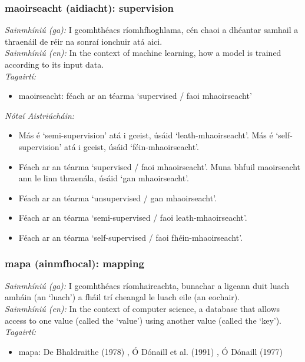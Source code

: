 \documentclass{article}
\begin{document}
\subsubsection*{maoirseacht (aidiacht): supervision}
 \noindent \textit{Sainmhíniú (ga):} I gcomhthéacs ríomhfhoghlama, cén chaoi a dhéantar samhail a thraenáil de réir na sonraí ionchuir atá aici.
\\
 \noindent \textit{Sainmhíniú (en):} In the context of machine learning, how a model is trained according to its input data.
\\
 \noindent \textit{Tagairtí:}
\begin{itemize}
	\item maoirseacht: féach ar an téarma `supervised / faoi mhaoirseacht'
\end{itemize}

 \noindent \textit{Nótaí Aistriúcháin:}
\begin{itemize}
	\item Más é `semi-supervision' atá i gceist, úsáid `leath-mhaoirseacht'. Más é `self-supervision' atá i gceist, úsáid `féin-mhaoirseacht'.
	\item Féach ar an téarma `supervised / faoi mhaoirseacht'. Muna bhfuil maoirseacht ann le linn thraenála, úsáid `gan mhaoirseacht'.
	\item Féach ar an téarma `unsupervised / gan mhaoirseacht'.
	\item Féach ar an téarma `semi-supervised / faoi leath-mhaoirseacht'.
	\item Féach ar an téarma `self-supervised / faoi fhéin-mhaoirseacht'.
\end{itemize}


\subsubsection*{mapa (ainmfhocal): mapping}
 \noindent \textit{Sainmhíniú (ga):} I gcomhthéacs ríomhaireachta, bunachar a ligeann duit luach amháin (an `luach') a fháil trí cheangal le luach eile (an eochair).
\\
 \noindent \textit{Sainmhíniú (en):} In the context of computer science, a database that allows access to one value (called the `value') using another value (called the `key').
\\
 \noindent \textit{Tagairtí:}
\begin{itemize}
	\item mapa: De Bhaldraithe (1978) \cite{de-bhaldraithe}, Ó Dónaill et al. (1991) \cite{focloir-beag}, Ó Dónaill (1977) \cite{odonaill}
\end{itemize}
\end{document}
